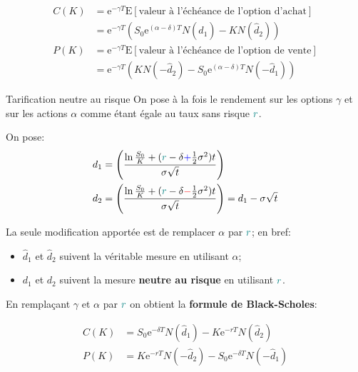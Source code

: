 \documentclass[10pt, french]{article}
\begin{document}
\begin{multicols*}{2}
\begin{definitionNOHFILL}
\begin{align*}
	C(K)
	&=	\textrm{e}^{-\gamma T}\text{E}[\text{valeur à l'échéance de l'option d'achat}]	\\
	&=	\textrm{e}^{-\gamma T} \left( S_{0} \textrm{e}^{(\alpha - \delta)T}N(\hat{d}_{1}) - K N(\hat{d}_{2})\right)	\\
	P(K)
	&=	\textrm{e}^{-\gamma T}\text{E}[\text{valeur à l'échéance de l'option de vente}]	\\
	&=	\textrm{e}^{-\gamma T} \left(K N(-\hat{d}_{2}) - S_{0}\textrm{e}^{(\alpha - \delta)T}N(-\hat{d}_{1})	\right)
\end{align*}
\end{definitionNOHFILL}

\begin{conceptgen}{Tarification neutre au risque}
On pose à la fois le rendement sur les options $\gamma$ et sur les actions $\alpha$ comme étant égale au taux sans risque ${\color{teal}r}$.

On pose:
\begin{align*}
	d_{1}
	&=	\left(
			\frac{\ln\frac{S_{0}}{K} + ({\color{teal}r} - \delta {\color{blue}+} \frac{1}{2}\sigma^{2})t}
	 			 {\sigma\sqrt{t}}
		\right)	\\
	d_{2}
	&=	\left(
			\frac{\ln\frac{S_{0}}{K} + ({\color{teal}r} - \delta {\color{red}-} \frac{1}{2}\sigma^{2})t}
	 			 {\sigma\sqrt{t}}
		\right)
	=	d_{1} - \sigma \sqrt{t}
\end{align*}

La seule modification apportée est de remplacer $\alpha$ par ${\color{teal}r}$; en bref:
\begin{itemize}
	\item	$\hat{d}_{1}$ et $\hat{d}_{2}$ suivent la véritable mesure en utilisant $\alpha$;
	\item	$d_{1}$ et $d_{2}$ suivent la mesure \textbf{neutre au risque} en utilisant ${\color{teal}r}$.
\end{itemize}

\begin{definitionNOHFILL}
En remplaçant $\gamma$ et $\alpha$ par ${\color{teal}r}$ on obtient la \textbf{formule de Black-Scholes}:

\begin{align*}
	C(K)
	&=	S_{0} \textrm{e}^{- \delta T} N(\hat{d}_{1}) - K\textrm{e}^{-rT} N(\hat{d}_{2})	\\
	P(K)
	&=	K\textrm{e}^{-rT} N(-\hat{d}_{2}) - S_{0}\textrm{e}^{-\delta T}N(-\hat{d}_{1})	
\end{align*}
\end{definitionNOHFILL}
\tcbline

\end{conceptgen}
\end{multicols*}
\end{document}
